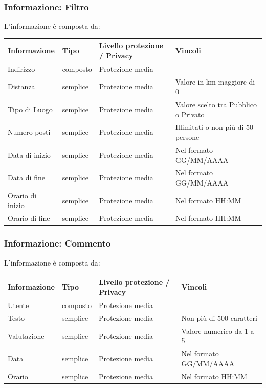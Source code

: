 \documentclass[12pt,a4paper]{report}
\let\oldhyperref\hyperref
\renewcommand{\hyperref}[2][]{\oldhyperref[#1]{\dotuline{#2}}}
\begin{document}
\subsubsection{Informazione: Filtro} \label{Filtro}
L'informazione \hyperref[Filtro]{Filtro} è composta da:
\begin{tabularx}{\textwidth}{|p{2.8cm}|p{1.8cm}|p{3.2cm}|X|}
    \hline
    \rowcolor{studyColor} \textbf{Informazione} & \textbf{Tipo} & \textbf{Livello protezione / Privacy} & \textbf{Vincoli} \\ \hline
    \endhead
    Indirizzo & composto & Protezione media & \\ \hline
    Distanza & semplice & Protezione media & Valore in km maggiore di 0 \\ \hline
    Tipo di Luogo & semplice & Protezione media & Valore scelto tra Pubblico o Privato \\ \hline
    Numero posti & semplice & Protezione media & Illimitati o non più di 50 persone \\ \hline
    Data di inizio & semplice & Protezione media & Nel formato GG/MM/AAAA \\ \hline
    Data di fine & semplice & Protezione media & Nel formato GG/MM/AAAA \\ \hline
    Orario di inizio & semplice & Protezione media & Nel formato HH:MM \\ \hline
    Orario di fine & semplice & Protezione media & Nel formato HH:MM \\ \hline
\end{tabularx}

\subsubsection{Informazione: Commento} \label{Commento}
L'informazione \hyperref[Commento]{Commento} è composta da:
\begin{tabularx}{\textwidth}{|p{2.8cm}|p{1.8cm}|p{3.2cm}|X|}
    \hline
    \rowcolor{studyColor} \textbf{Informazione} & \textbf{Tipo} & \textbf{Livello protezione / Privacy} & \textbf{Vincoli} \\ \hline
    \endhead
    Utente & composto & Protezione media & \\ \hline
    Testo & semplice & Protezione media & Non più di 500 caratteri \\ \hline
    Valutazione & semplice & Protezione media & Valore numerico da 1 a 5 \\ \hline
    Data & semplice & Protezione media & Nel formato GG/MM/AAAA \\ \hline
    Orario & semplice & Protezione media & Nel formato HH:MM \\ \hline
\end{tabularx}
\end{document}
